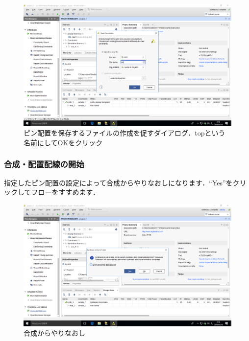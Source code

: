 \documentclass[a4paper,dvipdfmx]{jsarticle}
\begin{document}
 \begin{figure}[H]
  \begin{center}
   \includegraphics[width=.8\textwidth]{chapter03_figures/VirtualBox_Windows10_19_03_2018_00_16_35.png}
  \end{center}
  \caption{ピン配置を保存するファイルの作成を促すダイアログ．topという名前にしてOKをクリック \label{fig:xdc_config}}
 \end{figure}

\subsubsection{合成・配置配線の開始}
指定したピン配置の設定によって合成からやりなおしになります．``Yes''をクリックしてフローをすすめます．

 \begin{figure}[H]
  \begin{center}
   \includegraphics[width=.8\textwidth]{chapter03_figures/VirtualBox_Windows10_19_03_2018_00_16_41.png}
  \end{center}
  \caption{合成からやりなおし}
 \end{figure}
\end{document}
